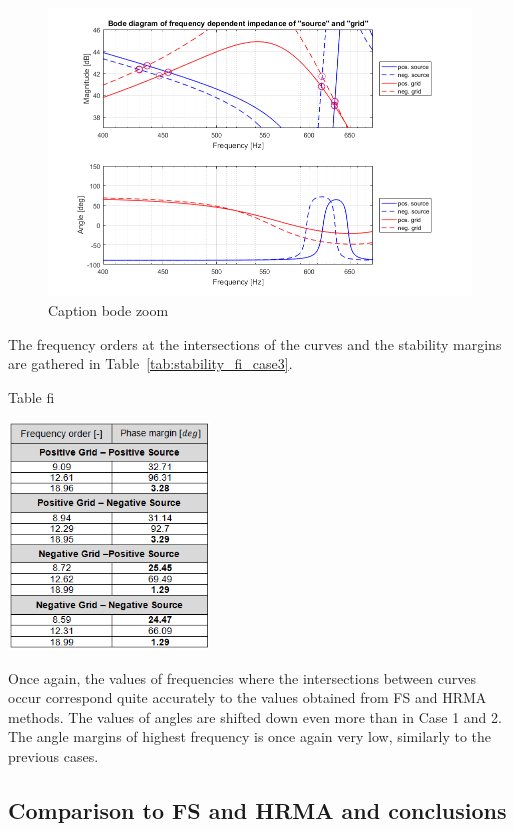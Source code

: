 \documentclass[12pt]{report} %
\begin{document}
\begin{figure}[htb]
	\centering
	\includegraphics[width=1\textwidth]{img/Case3/Case3_Bode_zoom.png}
	\caption{Caption bode zoom}
  	\label{fig:bode_zoom_case3}
\end{figure}
\FloatBarrier

The frequency orders at the intersections of the curves and the stability margins are gathered in Table~\ref{tab:stability_fi_case3}.

\begin{table}[htb]
	\centering
	\caption{Table fi}
	\includegraphics[width=0.4\textwidth]{img/Case3/stability_fi.png}
  	\label{tab:stability_fi_case3}
\end{table}
\FloatBarrier

Once again, the values of frequencies where the intersections between curves occur correspond quite accurately to the values obtained from FS and HRMA methods. The values of angles are shifted down even more than in Case 1 and 2. The angle margins of highest frequency is once again very low, similarly to the previous cases.

\subsection{Comparison to FS and HRMA and conclusions}
\end{document}
